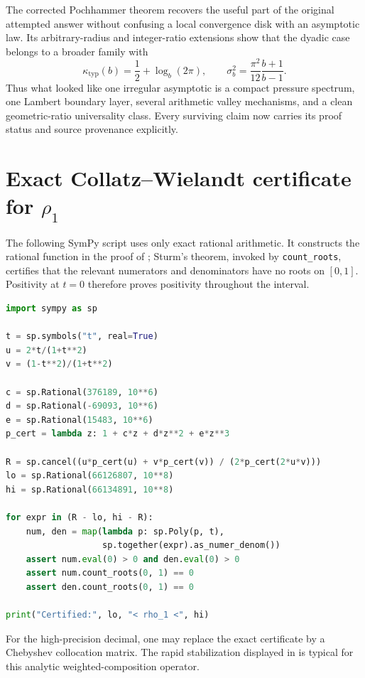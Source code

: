 \documentclass[11pt,oneside]{article}
\numberwithin{equation}{section}
\theoremstyle{definition}
\theoremstyle{remark}
\begin{document}
The corrected Pochhammer theorem recovers the useful part of the original attempted answer
without confusing a local convergence disk with an asymptotic law.  Its arbitrary-radius
and integer-ratio extensions show that the dyadic case belongs to a broader family with
\[
 \kappa_{\mathrm{typ}}(b)=\frac12+\log_b(2\pi),
 \qquad
 \sigma_b^2=\frac{\pi^2}{12}\frac{b+1}{b-1}.
\]
Thus what looked like one irregular asymptotic is a compact pressure spectrum, one Lambert
boundary layer, several arithmetic valley mechanisms, and a clean geometric-ratio
universality class.  Every surviving claim now carries its proof status and source
provenance explicitly.

\appendix

\section{Exact Collatz--Wielandt certificate for \texorpdfstring{$\rho_1$}{rho1}}
\label{app:certificate}

The following SymPy script uses only exact rational arithmetic.  It constructs the rational
function in the proof of ; Sturm's theorem, invoked by
\texttt{count\_roots}, certifies that the relevant numerators and denominators have no roots
on $[0,1]$.  Positivity at $t=0$ therefore proves positivity throughout the interval.

\begin{lstlisting}[style=code,language=Python]
import sympy as sp

t = sp.symbols("t", real=True)
u = 2*t/(1+t**2)
v = (1-t**2)/(1+t**2)

c = sp.Rational(376189, 10**6)
d = sp.Rational(-69093, 10**6)
e = sp.Rational(15483, 10**6)
p_cert = lambda z: 1 + c*z + d*z**2 + e*z**3

R = sp.cancel((u*p_cert(u) + v*p_cert(v)) / (2*p_cert(2*u*v)))
lo = sp.Rational(66126807, 10**8)
hi = sp.Rational(66134891, 10**8)

for expr in (R - lo, hi - R):
    num, den = map(lambda p: sp.Poly(p, t),
                   sp.together(expr).as_numer_denom())
    assert num.eval(0) > 0 and den.eval(0) > 0
    assert num.count_roots(0, 1) == 0
    assert den.count_roots(0, 1) == 0

print("Certified:", lo, "< rho_1 <", hi)
\end{lstlisting}

For the high-precision decimal, one may replace the exact certificate by a Chebyshev
collocation matrix.  The rapid stabilization displayed in  is typical
for this analytic weighted-composition operator.
\end{document}
